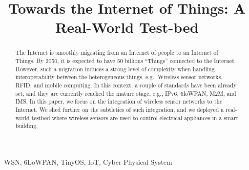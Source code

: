 \documentclass[conference]{IEEEtran}
\begin{document}
\title{Towards the Internet of Things: A Real-World Test-bed}
\author{
\and
{}
\and
{}
}
\maketitle
\begin{abstract}
The Internet is smoothly migrating from an Internet of people to an Internet of Things. By 2050, it is expected to have 50 billions “Things” connected to the Internet. 
However, such a migration induces a strong level of complexity when handling interoperability between the heterogeneous things, e.g., Wireless sensor networks, RFID, and mobile computing. In this context, a couple of standards have been already set, and they are currently reached the mature stage, e.g., IPv6, 6loWPAN, M2M, and IMS. In this paper, we focus on the integration of wireless sensor networks to the Internet. We shed further on the subtleties of such integration, and we deployed a real-world testbed where wireless sensors are used to control electrical appliances in a smart building. 
\end{abstract}

\begin{IEEEkeywords}
WSN, 6LoWPAN, TinyOS, IoT, Cyber Physical System
\end{IEEEkeywords}
\end{document}
